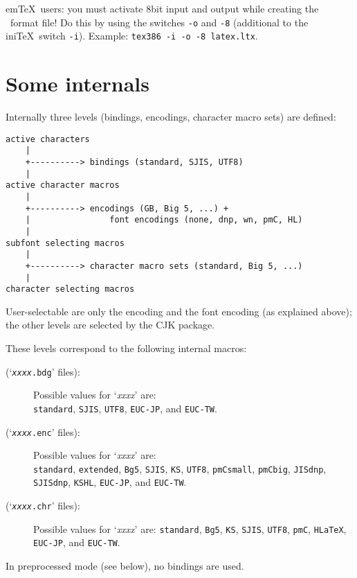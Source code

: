 \documentclass[a4paper, 11pt, draft]{article}
\begin{document}
\begin{itshape}%
  em\TeX\ users: you must activate 8bit input and output while creating the
  \LaTeXe\ format file! Do this by using the switches \texttt{-o} and \texttt{-8} (additional
  to the ini\TeX\ switch \texttt{-i}).
  Example:
  \texttt{tex386 -i -o -8 latex.ltx}.
  \par
\end{itshape}



\section{Some internals}

Internally three levels (bindings, encodings, character macro sets) are
defined:
%
\begin{verbatim}
active characters
    |
    +----------> bindings (standard, SJIS, UTF8)
    |
active character macros
    |
    +----------> encodings (GB, Big 5, ...) + 
    |                font encodings (none, dnp, wn, pmC, HL)
    |
subfont selecting macros
    |
    +----------> character macro sets (standard, Big 5, ...)
    |
character selecting macros
\end{verbatim}
%
User-selectable are only the encoding and the font encoding (as explained
above); the other levels are selected by the \textsf{CJK} package.

These levels correspond to the following internal macros:
%
\begin{description}
\item[\texttt{\string\CJK@xxxxBinding} (`\texttt{\textit{xxxx}.bdg}' files):]
  Possible values for `\textit{xxxx}' are: \\ \texttt{standard}, \texttt{SJIS}, \texttt{UTF8}, \texttt{EUC-JP}, and
  \texttt{EUC-TW}.
\item[\texttt{\string\CJK@xxxxEncoding} (`\texttt{\textit{xxxx}.enc}' files):]
  Possible values for `\textit{xxxx}' are: \\ \texttt{standard}, \texttt{extended}, \texttt{Bg5}, \texttt{SJIS}, \texttt{KS}, \texttt{UTF8},
  \texttt{pmCsmall}, \texttt{pmCbig}, \texttt{JISdnp}, \texttt{SJISdnp}, \texttt{KSHL}, \texttt{EUC-JP}, and \texttt{EUC-TW}.
\item[\texttt{\string\CJK@xxxxChr} (`\texttt{\textit{xxxx}.chr}' files):]
  Possible values for `\textit{xxxx}' are: \texttt{standard}, \texttt{Bg5}, \texttt{KS}, \texttt{SJIS}, \texttt{UTF8}, \texttt{pmC},
  \texttt{HLaTeX}, \texttt{EUC-JP}, and \texttt{EUC-TW}.
\end{description}
%
In preprocessed mode (see below), no bindings are used.
\end{document}
